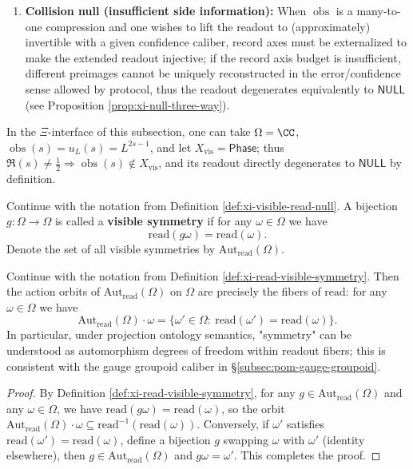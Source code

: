 \begin{definition}
\begin{enumerate}
  \item \textbf{Collision null (insufficient side information):} When \(\operatorname{obs}\) is a many-to-one compression and one wishes to lift the readout to (approximately) invertible with a given confidence caliber, record axes must be externalized to make the extended readout injective; if the record axis budget is insufficient, different preimages cannot be uniquely reconstructed in the error/confidence sense allowed by protocol, thus the readout degenerates equivalently to \(\mathsf{NULL}\) (see Proposition \ref{prop:xi-null-three-way}).
\end{enumerate}
In the \(\Xi\)-interface of this subsection, one can take \(\Omega=\CC\), \(\operatorname{obs}(s)=u_L(s)=L^{2s-1}\), and let \(X_{\mathrm{vis}}=\mathsf{Phase}\); thus \(\Re(s)\neq\tfrac12\Rightarrow \operatorname{obs}(s)\notin X_{\mathrm{vis}}\), and its readout directly degenerates to \(\mathsf{NULL}\) by definition.
\end{definition}

\begin{definition}\label{def:xi-read-visible-symmetry}
Continue with the notation from Definition \ref{def:xi-visible-read-null}.
A bijection \(g:\Omega\to\Omega\) is called a \textbf{visible symmetry} if for any \(\omega\in\Omega\) we have
\[
\mathrm{read}(g\omega)=\mathrm{read}(\omega).
\]
Denote the set of all visible symmetries by \(\mathrm{Aut}_{\mathrm{read}}(\Omega)\).
\end{definition}

\begin{proposition}\label{prop:xi-read-fiber-orbits}
Continue with the notation from Definition \ref{def:xi-read-visible-symmetry}.
Then the action orbits of \(\mathrm{Aut}_{\mathrm{read}}(\Omega)\) on \(\Omega\) are precisely the fibers of \(\mathrm{read}\): for any \(\omega\in\Omega\) we have
\[
\mathrm{Aut}_{\mathrm{read}}(\Omega)\cdot\omega
=\{\omega'\in\Omega:\ \mathrm{read}(\omega')=\mathrm{read}(\omega)\}.
\]
In particular, under projection ontology semantics, "symmetry" can be understood as automorphism degrees of freedom within readout fibers; this is consistent with the gauge groupoid caliber in \S\ref{subsec:pom-gauge-groupoid}.
\end{proposition}

\begin{proof}
By Definition \ref{def:xi-read-visible-symmetry}, for any \(g\in\mathrm{Aut}_{\mathrm{read}}(\Omega)\) and any \(\omega\in\Omega\), we have \(\mathrm{read}(g\omega)=\mathrm{read}(\omega)\), so the orbit \(\mathrm{Aut}_{\mathrm{read}}(\Omega)\cdot\omega\subseteq \mathrm{read}^{-1}(\mathrm{read}(\omega))\).
Conversely, if \(\omega'\) satisfies \(\mathrm{read}(\omega')=\mathrm{read}(\omega)\), define a bijection \(g\) swapping \(\omega\) with \(\omega'\) (identity elsewhere), then \(g\in\mathrm{Aut}_{\mathrm{read}}(\Omega)\) and \(g\omega=\omega'\).
This completes the proof.
\end{proof}

